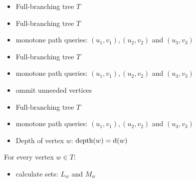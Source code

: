 \documentclass[18pt]{beamer}
\begin{document}
\begin{frame}
\begin{figure}
\begin{tikzpicture}[node distance=1.5cm]
		\end{tikzpicture}
	\end{figure}
	\begin{overprint}
			\begin{itemize}
				\item {\color{blue} Full-branching} tree $T$
			\end{itemize}
			\begin{itemize}
				\item {\color{blue} Full-branching} tree $T$
				\item monotone path queries: {\color{blue} $(u_1,v_1), (u_2, v_2)$} and {\color{blue} $(u_3, v_3)$}
			\end{itemize}
			\begin{itemize}
				\item {\color{blue} Full-branching} tree $T$
				\item monotone path queries: {\color{blue} $(u_1,v_1), (u_2, v_2)$} and {\color{blue} $(u_3, v_3)$}
				\item ommit unneeded vertices
			\end{itemize}
			\begin{itemize}
				\item {\color{blue} Full-branching} tree $T$
				\item monotone path queries: {\color{blue} $(u_1,v_1), (u_2, v_2)$} and {\color{blue} $(u_3, v_3)$}
				\item Depth of vertex $w$: $\textup{depth}(w) = \textup{d}(w)$ 
			\end{itemize}
			For every vertex $w \in T$: 
			\begin{itemize}
				\item calculate sets: {\color{blue} $L_w$} and {\color{blue}$M_w$}
				

\end{itemize}
\end{overprint}
\end{frame}
\end{document}
